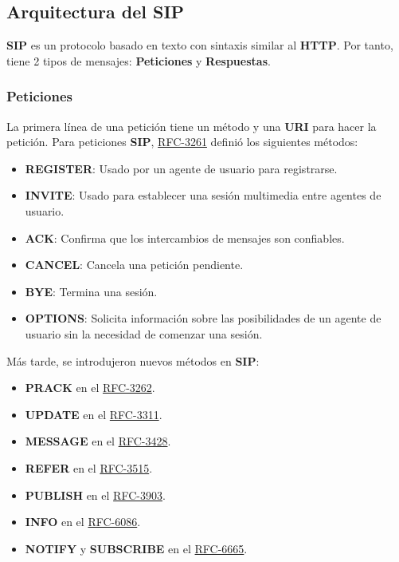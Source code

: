 \documentclass[a4paper, 11pt]{article} %
\newcommand{\RFC}[1]{\href{https://www.ietf.org/rfc/rfc#1.txt}{RFC-#1}}
\begin{document}
	\subsection{Arquitectura del SIP}
	\textbf{SIP} es un protocolo basado en texto con sintaxis similar al \textbf{HTTP}. Por tanto, tiene 2 tipos de mensajes: \textbf{Peticiones} y \textbf{Respuestas}.
		
		\subsubsection{Peticiones}
		La primera línea de una petición tiene un método y una \textbf{URI} para hacer la petición. Para peticiones \textbf{SIP}, \RFC{3261} definió los siguientes métodos:
		\begin{itemize}
			\item \textbf{REGISTER}: Usado por un agente de usuario para registrarse.
			\item \textbf{INVITE}: Usado para establecer una sesión multimedia entre agentes de usuario.
			\item \textbf{ACK}: Confirma que los intercambios de mensajes son confiables.
			\item \textbf{CANCEL}: Cancela una petición pendiente.
			\item \textbf{BYE}: Termina una sesión.
			\item \textbf{OPTIONS}: Solicita información sobre las posibilidades de un agente de usuario sin la necesidad de comenzar una sesión.
		\end{itemize}
		Más tarde, se introdujeron nuevos métodos en \textbf{SIP}:
		\begin{itemize}
			\item \textbf{PRACK} en el \RFC{3262}.
			\item \textbf{UPDATE} en el \RFC{3311}.
			\item \textbf{MESSAGE} en el \RFC{3428}.
			\item \textbf{REFER} en el \RFC{3515}.
			\item \textbf{PUBLISH} en el \RFC{3903}.
			\item \textbf{INFO} en el \RFC{6086}.
			\item \textbf{NOTIFY} y \textbf{SUBSCRIBE} en el \RFC{6665}.
		\end{itemize}
		
\end{document}
